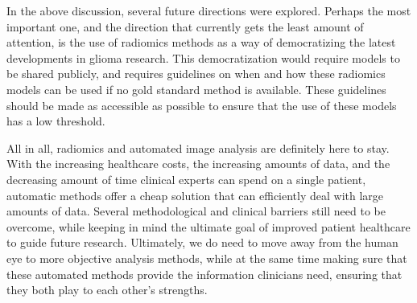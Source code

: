 In the above discussion, several future directions were explored.
Perhaps the most important one, and the direction that currently gets the least amount of attention, is the use of radiomics methods as a way of democratizing the latest developments in glioma research.
This democratization would require models to be shared publicly, and requires guidelines on when and how these radiomics models can be used if no gold standard method is available.
These guidelines should be made as accessible as possible to ensure that the use of these models has a low threshold.

All in all, radiomics and automated image analysis are definitely here to stay.
With the increasing healthcare costs, the increasing amounts of data, and the decreasing amount of time clinical experts can spend on a single patient, automatic methods offer a cheap solution that can efficiently deal with large amounts of data.
Several methodological and clinical barriers still need to be overcome, while keeping in mind the ultimate goal of improved patient healthcare to guide future research.
Ultimately, we do need to move away from the human eye to more objective analysis methods, while at the same time making sure that these automated methods provide the information clinicians need, ensuring that they both play to each other's strengths.
